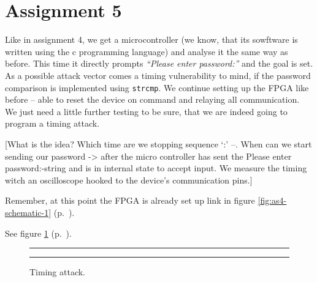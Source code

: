 \section*{Assignment 5}
%
% 

Like in assignment 4, we get a microcontroller (we know, that its sowftware is written using the c programming language) and analyse it the same way as before. 
This time it directly prompts \textit{``Please enter password:''} and the goal is set. As a possible attack vector comes a timing vulnerability to mind, if the password comparison is implemented using \texttt{strcmp}. We continue setting up the FPGA like before -- able to reset the device on command and relaying all communication. We just need a little further testing to be sure, that we are indeed going to program a timing attack.

[What is the idea? Which time are we stopping sequence `:' --. When can we start sending our password -> after the micro controller has sent the Please enter password:-string and is in internal state to accept input. We measure the timing witch an oscilloscope hooked to the device's communication pins.]

Remember, at this point the FPGA is already set up link in figure \ref{fig:as4-schematic-1} (p.~\pageref{fig:as4-schematic-1}).

See figure \ref{fig:as5-schematic} (p.~\pageref{fig:as5-schematic}).

\begin{figure}[hb]
    \begin{center}
        \hrule\vspace{1em}
        
        \caption{Timing attack.}
        \label{fig:as5-schematic}
        \vspace{1em}\hrule
    \end{center}
\end{figure}
